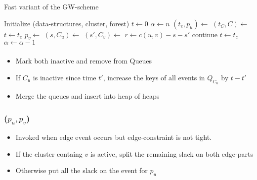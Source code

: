 \documentclass[11pt]{beamer}
\begin{document}
\begin{frame}[plain, shrink=30]
	\begin{algorithm}[H]
		\caption{ Fast variant of the GW-scheme }
		\begin{algorithmic}[1]
			\State Initialize (data-structures, cluster, forest)
			\State $t \leftarrow 0$ 
			\State $\alpha \leftarrow n$ 
			\State $(t_e,p_u) \leftarrow$ 
			\State $(t_C,C) \leftarrow$ 
			\State $t \leftarrow t_e$
			\State {} 
			\State $p_v \leftarrow$ 
			\State $(s,C_u) \leftarrow$ 
			\State $(s',C_v) \leftarrow$ 
			\State $r \leftarrow c(u,v) - s - s'$ 
			 
			\State continue
			\EndIf
			\State {}
			\Else
			\State {}
			\EndIf
			\Else
			\State $t \leftarrow t_c$
			\State {}
			\State {}
			\State $\alpha \leftarrow \alpha -1$
			\EndIf
			\EndWhile
			\State {}
			\EndFunction
		\end{algorithmic}
	\end{algorithm}
\end{frame}

\begin{frame} 
	\frametitle{}
	\begin{itemize}
		\item Mark both inactive and remove from Queues
		\item If $C_u$ is inactive since time $t'$, increase the keys of all events in $Q_{C_u}$ by $t-t'$
		\item Merge the queues and insert into heap of heaps
	\end{itemize}
\end{frame}

\begin{frame} 
	\frametitle{($p_u,p_v$)}
	\begin{itemize}
		\item Invoked when edge event occurs but edge-constraint is not tight.
		\item If the cluster containg $v$ is active, split the remaining slack on both edge-parts
		\item Otherwise put all the slack on the event for $p_u$
	\end{itemize}
\end{frame}
\end{document}
